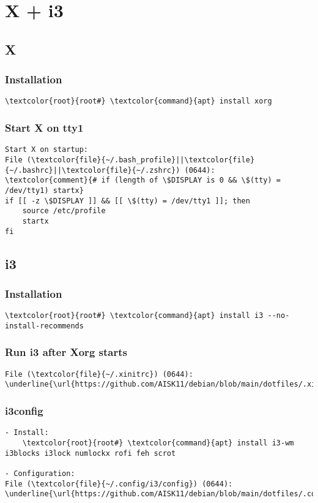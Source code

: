 \documentclass[10pt, a4paper, onecolumn, openany]{book} %
\begin{document}
\chapter{X + i3}
\section{X}
\subsection{Installation}
\begin{Verbatim}[commandchars=\\\{\}]
    \textcolor{root}{root#} \textcolor{command}{apt} install xorg
\end{Verbatim}
\subsection{Start X on tty1}
\begin{Verbatim}[commandchars=\\\{\}]
Start X on startup:
File (\textcolor{file}{~/.bash_profile}||\textcolor{file}{~/.bashrc}||\textcolor{file}{~/.zshrc}) (0644):
\textcolor{comment}{# if (length of \$DISPLAY is 0 && \$(tty) = /dev/tty1) startx}
if [[ -z \$DISPLAY ]] && [[ \$(tty) = /dev/tty1 ]]; then
    source /etc/profile
    startx
fi
\end{Verbatim}
\section{i3}
\subsection{Installation}
\begin{Verbatim}[commandchars=\\\{\}]
    \textcolor{root}{root#} \textcolor{command}{apt} install i3 --no-install-recommends
\end{Verbatim}
\subsection{Run i3 after Xorg starts}
\begin{Verbatim}[commandchars=\\\{\}]
File (\textcolor{file}{~/.xinitrc}) (0644):
\underline{\url{https://github.com/AISK11/debian/blob/main/dotfiles/.xinitrc}}
\end{Verbatim}
\subsection{i3config}
\begin{Verbatim}[commandchars=\\\{\}]
- Install:
    \textcolor{root}{root#} \textcolor{command}{apt} install i3-wm i3blocks i3lock numlockx rofi feh scrot
    
- Configuration:
File (\textcolor{file}{~/.config/i3/config}) (0644):
\underline{\url{https://github.com/AISK11/debian/blob/main/dotfiles/.config/i3/config}}
\end{Verbatim}
\end{document}
